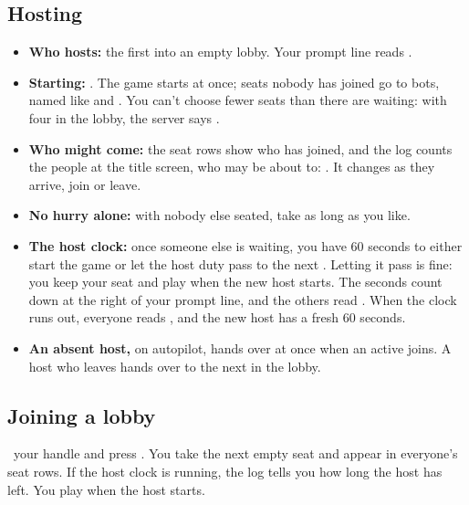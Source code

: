 \subsection{Hosting}
\begin{itemize}
  \item \textbf{Who hosts:} the first  into an empty lobby. Your prompt line reads
    \code{\HostAsk}.
  \item \textbf{Starting:} \HostStart. The game starts at once; seats
    nobody has joined go to bots, named like  and . You can't choose fewer seats than there are
     waiting: with four in the lobby, the server says .
  \item \textbf{Who might come:} the seat rows show who has joined, and the log counts the people at the title
    screen, who may be about to: . It changes as they arrive, join or leave.
  \item \textbf{No hurry alone:} with nobody else seated, take as long as you like.
  \item \textbf{The host clock:} once someone else is waiting, you have 60 seconds to either start the game or
    let the host duty pass to the next . Letting it pass is fine: you keep your seat and play when the
    new host starts. The seconds count down at the right of your prompt line, and the others read
    . When the clock runs out, everyone reads ,
    and the new host has a fresh 60 seconds.
  \item \textbf{An absent host,} on autopilot, hands over at once when an active  joins. A host who
    leaves hands over to the next  in the lobby.
\end{itemize}

\subsection{Joining a lobby}
\Typeword\ your handle and press \key{\KeyReturn}. You take the next empty seat and appear in everyone's seat rows. If
the host clock is running, the log tells you how long the host has left. You play when the host starts.


